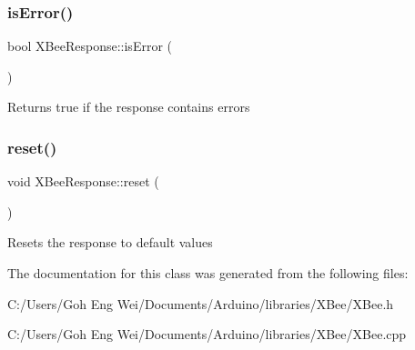 \subsubsection{\texorpdfstring{is\+Error()}{isError()}}
{\footnotesize\ttfamily bool X\+Bee\+Response\+::is\+Error (\begin{DoxyParamCaption}{ }\end{DoxyParamCaption})}

Returns true if the response contains errors \hypertarget{class_x_bee_response_aa08a73f576fc7ce2f7fa154342c01fba}{}\label{class_x_bee_response_aa08a73f576fc7ce2f7fa154342c01fba} 
\subsubsection{\texorpdfstring{reset()}{reset()}}
{\footnotesize\ttfamily void X\+Bee\+Response\+::reset (\begin{DoxyParamCaption}{ }\end{DoxyParamCaption})}

Resets the response to default values 

The documentation for this class was generated from the following files\+:\begin{DoxyCompactItemize}
\item 
C\+:/\+Users/\+Goh Eng Wei/\+Documents/\+Arduino/libraries/\+X\+Bee/X\+Bee.\+h\item 
C\+:/\+Users/\+Goh Eng Wei/\+Documents/\+Arduino/libraries/\+X\+Bee/X\+Bee.\+cpp\end{DoxyCompactItemize}
